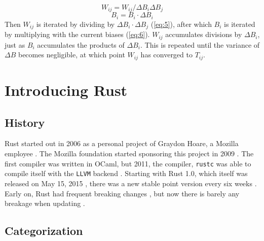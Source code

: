 \begin{equation}\label{eq:5}
    W_{ij} = W_{ij} / \Delta B_i \Delta B_j
\end{equation}
\begin{equation}\label{eq:6}
    B_i = B_i \cdot \Delta B_i
\end{equation}
Then $W_{ij}$ is iterated by dividing by $\Delta B_i \cdot \Delta B_j$
(\eqref{eq:5}), after which $B_i$ is iterated by multiplying with the current
biases (\eqref{eq:6}). $W_{ij}$ accumulates divisions by $\Delta B_i$, just as
$B_i$ accumulates the products of $\Delta B_i$. This is repeated until the
variance of $\Delta B$ becomes negligible, at which point $W_{ij}$ has converged
to $T_{ij}$.






\section{Introducing Rust}\label{sec:Rust}


\subsection{History}\label{sec:RustHistory}

Rust started out in 2006 as a personal project of Graydon Hoare, a Mozilla
employee \cite{rustbegin}. The Mozilla foundation started sponsoring this
project in 2009 \cite{rustbegin}. The first compiler was written in OCaml, but
2011, the compiler, \verb|rustc| was able to compile itself with the
\verb|LLVM| backend \cite{rustcompile}. Starting with Rust 1.0, which itself
was released on May 15, 2015 \cite{rustversions}, there was a new stable point
version every six weeks \cite{rustversions}. Early on, Rust had frequent
breaking changes \cite{rustchanges}, but now there is barely any breakage when
updating \cite{rustupdate}.


\subsection{Categorization}\label{sec:RustCategory}

